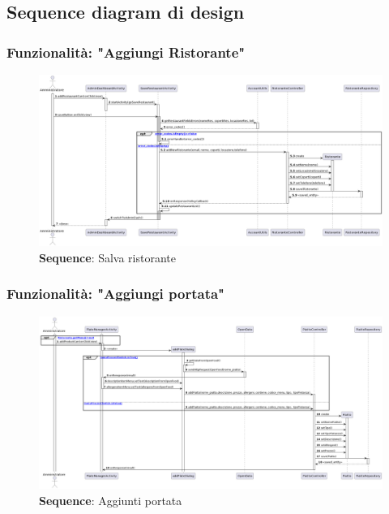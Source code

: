 \subsection{Sequence diagram di design}

\subsubsection{Funzionalità: "Aggiungi Ristorante"}
\begin{flushleft}


\end{flushleft}


\begin{figure}[H]
    \centering
    \includegraphics[scale=0.3]{assets/diagrammi/Sequence di design/Salva Ristorante.png}
    \caption{\textbf{Sequence}: Salva ristorante}\label{fig:seq_save_rest}
\end{figure}

\subsubsection{Funzionalità: "Aggiungi portata"}

\begin{figure}[H]
    \centering
    \includegraphics[scale=0.3]{assets/diagrammi/Sequence di design/Aggiungi Piatto.png}
    \caption{\textbf{Sequence}: Aggiunti portata}\label{fig:seq_save_plate}
\end{figure}

